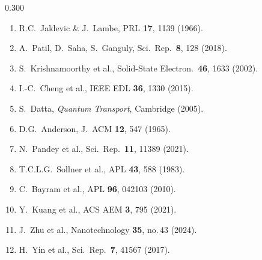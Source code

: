 \documentclass[final]{beamer}
\begin{document}
\begin{frame}[t]{}
\begin{columns}[T]
\begin{column}{0.300\textwidth}
\begin{tcolorbox}[posterbox, title={References}]
{\scriptsize
\begin{enumerate}\setlength\itemsep{1pt}
  \item R.C.\ Jaklevic \& J.\ Lambe, PRL \textbf{17}, 1139 (1966).
  \item A.\ Patil, D.\ Saha, S.\ Ganguly, Sci.\ Rep.\ \textbf{8}, 128 (2018).
  \item S.\ Krishnamoorthy et al., Solid-State Electron.\ \textbf{46}, 1633 (2002).
  \item I.-C.\ Cheng et al., IEEE EDL \textbf{36}, 1330 (2015).
  \item S.\ Datta, \textit{Quantum Transport}, Cambridge (2005).
  \item D.G.\ Anderson, J.\ ACM \textbf{12}, 547 (1965).
  \item N.\ Pandey et al., Sci.\ Rep.\ \textbf{11}, 11389 (2021).
  \item T.C.L.G.\ Sollner et al., APL \textbf{43}, 588 (1983).
  \item C.\ Bayram et al., APL \textbf{96}, 042103 (2010).
  \item Y.\ Kuang et al., ACS AEM \textbf{3}, 795 (2021).
  \item J.\ Zhu et al., Nanotechnology \textbf{35}, no.\,43 (2024).
  \item H.\ Yin et al., Sci.\ Rep.\ \textbf{7}, 41567 (2017).
\end{enumerate}
}
\end{tcolorbox}

\end{column}

\end{columns}

\end{frame}
\end{document}
